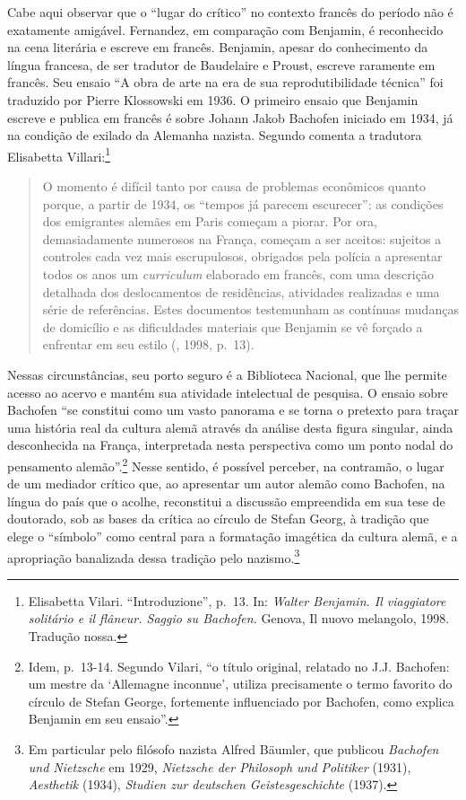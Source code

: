 Cabe aqui observar que o ``lugar do crítico'' no contexto francês do
período não é exatamente amigável. Fernandez, em comparação com
Benjamin, é reconhecido na cena literária e escreve em francês.
Benjamin, apesar do conhecimento da língua francesa, de ser tradutor de
Baudelaire e Proust, escreve raramente em francês. Seu ensaio ``A obra
de arte na era de sua reprodutibilidade técnica'' foi traduzido por
Pierre Klossowski em 1936. O primeiro ensaio que Benjamin escreve e
publica em francês é sobre Johann Jakob Bachofen iniciado em 1934, já na
condição de exilado da Alemanha nazista. Segundo comenta a tradutora
Elisabetta Villari:\footnote{Elisabetta Vilari. ``Introduzione'', p.~13.
  In: \emph{Walter Benjamin. Il viaggiatore solitário e il flâneur.
  Saggio su Bachofen.} Genova, Il nuovo melangolo, 1998. Tradução nossa.}


\begin{quote}
O momento é difícil tanto por causa de problemas econômicos quanto
porque, a partir de 1934, os ``tempos já parecem escurecer'': as
condições dos emigrantes alemães em Paris começam a piorar. Por ora,
demasiadamente numerosos na França, começam a ser aceitos: sujeitos a
controles cada vez mais escrupulosos, obrigados pela polícia a
apresentar todos os anos um \emph{curriculum} elaborado em francês, com
uma descrição detalhada dos deslocamentos de residências, atividades
realizadas e uma série de referências. Estes documentos testemunham as
contínuas mudanças de domicílio e as dificuldades materiais que Benjamin
se vê forçado a enfrentar em seu estilo (, 1998, p.~13).
\end{quote}

Nessas circunstâncias, seu porto seguro é a Biblioteca Nacional, que lhe
permite acesso ao acervo e mantém sua atividade intelectual de pesquisa.
O ensaio sobre Bachofen ``se constitui como um vasto panorama e se torna
o pretexto para traçar uma história real da cultura alemã através da
análise desta figura singular, ainda desconhecida na França,
interpretada nesta perspectiva como um ponto nodal do pensamento
alemão''.\footnote{Idem, p.~13-14. Segundo Vilari, ``o título original,
  relatado no J.J. Bachofen: um mestre da `Allemagne inconnue', utiliza
  precisamente o termo favorito do círculo de Stefan George, fortemente
  influenciado por Bachofen, como explica Benjamin em seu ensaio''.}
Nesse sentido, é possível perceber, na contramão, o lugar de um mediador
crítico que, ao apresentar um autor alemão como Bachofen, na língua do
país que o acolhe, reconstitui a discussão empreendida em sua tese de
doutorado, sob as bases da crítica ao círculo de Stefan Georg, à
tradição que elege o ``símbolo'' como central para a formatação
imagética da cultura alemã, e a apropriação banalizada dessa tradição
pelo nazismo.\footnote{Em particular pelo filósofo nazista Alfred
  Bäumler, que publicou \emph{Bachofen und Nietzsche} em 1929,
  \emph{Nietzsche der Philosoph und Politiker} (1931), \emph{Aesthetik}
  (1934), \emph{Studien zur deutschen Geistesgeschichte} (1937).}

